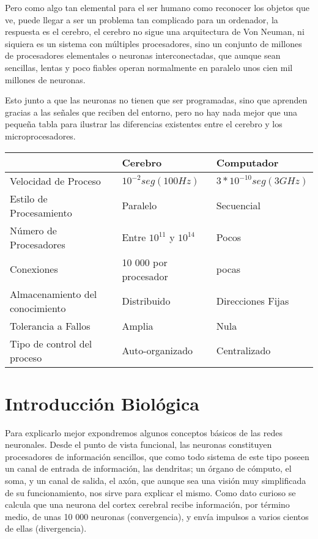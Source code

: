 \documentclass[11pt, oneside]{article}   	%
\begin{document}
Pero como algo tan elemental para el ser humano como reconocer los objetos que ve, puede llegar a ser un problema tan
complicado para un ordenador, la respuesta es el cerebro, el cerebro no sigue una arquitectura de Von Neuman, ni
siquiera es un sistema con múltiples procesadores, sino un conjunto de millones de procesadores elementales o neuronas
interconectadas, que aunque sean sencillas, lentas y poco fiables operan normalmente en paralelo unos cien mil millones
de neuronas.\\

\newpage %

Esto junto a que las neuronas no tienen que ser programadas, sino que aprenden gracias a las señales que reciben del
entorno, pero no hay nada mejor que una pequeña tabla para ilustrar las diferencias existentes entre el cerebro y los
microprocesadores.\\

\begin{tabular}{|l|l|l|}
\hline 
  &  Cerebro & Computador \\ 
\hline 
Velocidad de Proceso & \begin{math} 10^{-2} seg (100 Hz) \end{math} & \begin{math} 3*10^{-10} seg (3 GHz) \end{math} \\  %
\hline 
Estilo de Procesamiento & Paralelo & Secuencial \\ 
\hline 
Número de Procesadores & Entre \(10^{11}\) y \(10^{14}\) & Pocos \\  %
\hline 
Conexiones & 10 000 por procesador & pocas \\  %
\hline 
Almacenamiento del conocimiento & Distribuido & Direcciones Fijas \\  
\hline 
Tolerancia a Fallos & Amplia & Nula \\  
\hline 
Tipo de control del proceso & Auto-organizado & Centralizado \\  
\hline 
\end{tabular} 

\section{Introducción Biológica}

Para explicarlo mejor expondremos algunos conceptos básicos de las redes neuronales. Desde el punto de vista funcional,
las neuronas constituyen procesadores de información sencillos, que como todo sistema de este tipo poseen un canal de
entrada de información, las dendritas; un órgano de cómputo, el soma, y un canal de salida, el axón, que aunque sea una
visión muy simplificada de su funcionamiento, nos sirve para explicar el mismo. Como dato curioso se calcula que una
neurona del cortex cerebral recibe información, por término medio, de unas 10 000 neuronas (convergencia), y envía
impulsos a varios cientos de ellas (divergencia).\\
\end{document}
